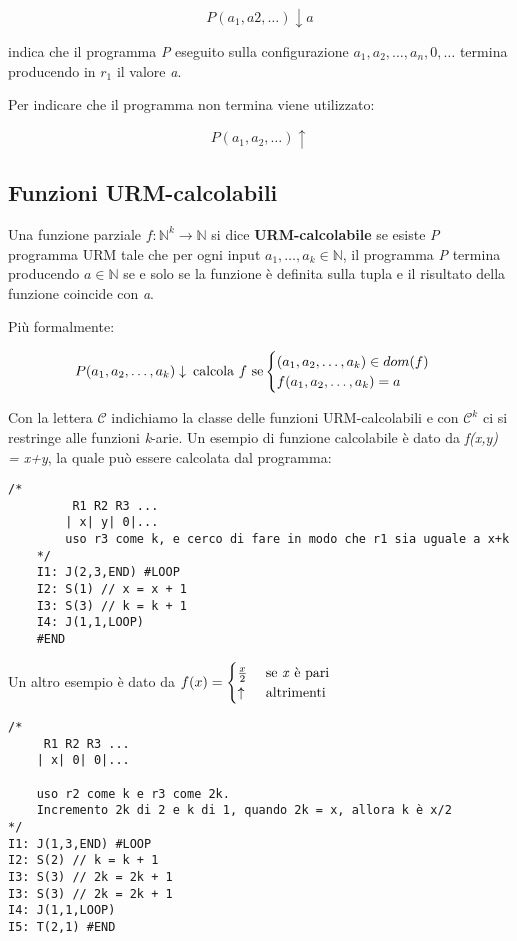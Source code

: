 $$
P(a_1, a2, \ldots) \downarrow a
$$

indica che il programma \emph{P} eseguito sulla configurazione $a_1, a_2, \ldots, a_n, 0,\ldots$ termina producendo in $r_1$ il valore \emph{a}.

Per indicare che il programma non termina viene utilizzato:

$$
P(a_1, a_2, \ldots)\uparrow
$$

\subsection{Funzioni URM-calcolabili}\label{funzioni-urm-calcolabili}

Una funzione parziale $f: \mathbb{N}^k \rightarrow \mathbb{N}$ si dice \textbf{URM-calcolabile} se esiste \emph{P} programma URM tale che per ogni input $a_1, \ldots, a_k \in \mathbb{N}$, il programma \emph{P} termina producendo $a \in \mathbb{N}$ se e solo se la funzione è definita sulla tupla e il risultato della funzione coincide con \emph{a}.

Più formalmente:

$$
P(a_1, a_2, \ldots, a_k)\downarrow \: \text{calcola $ f $ se}
\begin{cases}
(a_1, a_2, \ldots, a_k) \in dom(f) \\
f(a_1, a_2, \ldots, a_k) = a
\end{cases}
$$


Con la lettera $\mathcal{C}$ indichiamo la classe delle funzioni URM-calcolabili e con $\mathcal{C}^k$ ci si restringe alle funzioni \emph{k}-arie.
Un esempio di funzione calcolabile è dato da \emph{f(x,y) = x+y}, la quale può essere calcolata dal programma:

\begin{lstlisting}[language=URM]
	/*
		 R1 R2 R3 ...
		| x| y| 0|...
		uso r3 come k, e cerco di fare in modo che r1 sia uguale a x+k
	*/
	I1: J(2,3,END) #LOOP
	I2: S(1) // x = x + 1
	I3: S(3) // k = k + 1 
	I4: J(1,1,LOOP)
	#END
\end{lstlisting}

Un altro esempio è dato da $ f(x) = \begin{cases}
\frac{x}{2} &\text{ se \textit{x} è pari} \\
\uparrow &\text{ altrimenti}
\end{cases}$

\begin{lstlisting}[language=URM]
 /*
	 R1 R2 R3 ...
	| x| 0| 0|...
	
	uso r2 come k e r3 come 2k.
	Incremento 2k di 2 e k di 1, quando 2k = x, allora k è x/2
*/
I1: J(1,3,END) #LOOP
I2: S(2) // k = k + 1
I3: S(3) // 2k = 2k + 1 
I3: S(3) // 2k = 2k + 1 
I4: J(1,1,LOOP)
I5: T(2,1) #END
\end{lstlisting}

